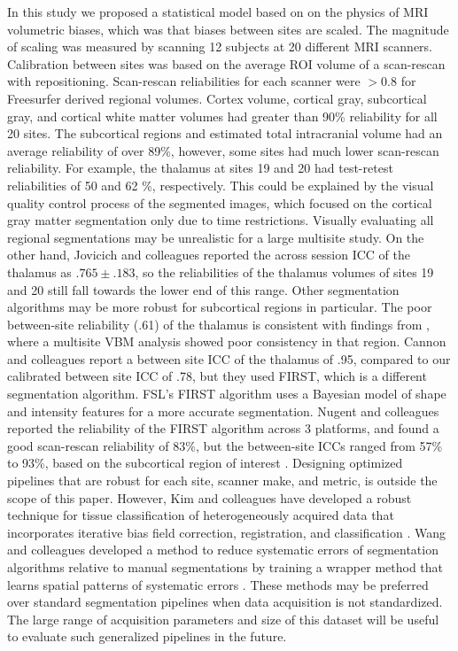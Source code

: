 In this study we proposed a statistical model based on on the physics of MRI volumetric biases, which was that biases between sites are scaled. The magnitude of scaling was measured by scanning 12 subjects at 20 different MRI scanners. Calibration between sites was based on the average ROI volume of a scan-rescan with repositioning. Scan-rescan reliabilities for each scanner were $>0.8$ for Freesurfer derived regional volumes. Cortex volume, cortical gray, subcortical gray, and cortical white matter volumes had greater than 90\% reliability for all 20 sites. The subcortical regions and estimated total intracranial volume had an average reliability of over 89\%, however, some sites had much lower scan-rescan reliability. For example, the thalamus at sites 19 and 20 had test-retest reliabilities of 50 and 62 \%, respectively. This could be explained by the visual quality control process of the segmented images, which focused on the cortical gray matter segmentation only due to time restrictions. Visually evaluating all regional segmentations may be unrealistic for a large multisite study. On the other hand, Jovicich and colleagues \cite{jovicich2013brain} reported the across session ICC of the thalamus as $.765 \pm .183$, so the reliabilities of the thalamus volumes of sites 19 and 20 still fall towards the lower end of this range. Other segmentation algorithms may be more robust for subcortical regions in particular. The poor between-site reliability (.61) of the thalamus is consistent with findings from \cite{schnack2010mapping}, where a multisite VBM analysis showed poor consistency in that region. Cannon and colleagues \cite{cannon2014} report a between site ICC of the thalamus of .95, compared to our calibrated between site ICC of .78, but they used FIRST, which is a different segmentation algorithm. FSL's FIRST algorithm \cite{firstcitation} uses a Bayesian model of shape and intensity features for a more accurate segmentation. Nugent and colleagues reported the reliability of the FIRST algorithm across 3 platforms, and found a good scan-rescan reliability of 83\%, but the between-site ICCs ranged from 57\% to 93\%, based on the subcortical region of interest \cite{firstreliability}. Designing optimized pipelines that are robust for each site, scanner make, and metric, is outside the scope of this paper. However, Kim and colleagues have developed a robust technique for tissue classification of heterogeneously acquired data that incorporates iterative bias field correction, registration, and classification \cite{optimize}. Wang and colleagues developed a method to reduce systematic errors of segmentation algorithms relative to manual segmentations by training a wrapper method that learns spatial patterns of systematic errors \cite{Wang2011}. These methods may be preferred over standard segmentation pipelines when data acquisition is not standardized. The large range of acquisition parameters and size of this dataset will be useful to evaluate such generalized pipelines in the future.